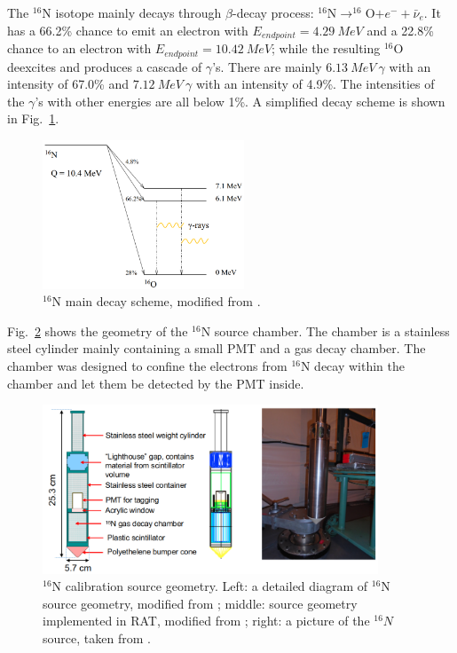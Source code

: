 The $^{16}$N isotope mainly decays through $\beta$-decay process: $^{16}$N$\to ^{16}$O$+e^-+\bar{\nu}_e$. It has a 66.2\% chance to emit an electron with $E_{endpoint}=4.29~MeV$ and a 22.8\% chance to an electron with $E_{endpoint}=10.42~MeV$; while the resulting $^{16}$O deexcites and produces a cascade of $\gamma$'s. There are mainly $6.13~MeV~\gamma$ with an intensity of 67.0\% and 
$7.12~MeV~\gamma$ with an intensity of 4.9\%. The intensities of the $\gamma$'s with other energies are all below 1\%\cite{nndc}. A simplified decay scheme is shown in Fig.~\ref{n16decay}.

\begin{figure}[!htb]
	\centering
	\includegraphics[width=6cm]{n16_decay.png}
	\caption{$^{16}$N main decay scheme, modified from \cite{dragowsky200216n}.}
	\label{n16decay}
\end{figure}

Fig.~\ref{n16pic} shows the geometry of the $^{16}$N source chamber. The chamber is a stainless steel cylinder mainly containing a small PMT and a gas decay chamber. The chamber was designed to confine the electrons from $^{16}$N decay within the chamber and let them be detected by the PMT inside\cite{dragowsky1999sudbury}.






\begin{figure}[!htb]
	\centering
	\includegraphics[width=10cm]{n16geom.png}
	\caption{$^{16}$N calibration source geometry. Left: a detailed diagram of $^{16}$N source geometry, modified from \cite{maclellan2009energy,matt_deployedsource}; middle: source geometry implemented in RAT, modified from \cite{n16geom_zach}; right: a picture of the $^{16}N$ source, taken from \cite{n16pic}.}
	\label{n16pic}
\end{figure}

